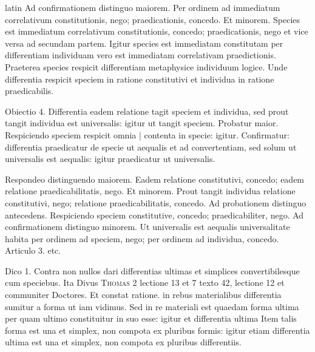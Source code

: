 \begin{otherlanguage*}{latin}
\pstart
 Ad confirmationem distinguo maiorem. Per ordinem ad immediatum correlativum constitutionis, nego; praedicationis, concedo. Et minorem. Species est immediatum correlativum constitutionis, concedo; praedicationis, nego et vice versa ad secundam partem. Igitur species est immediatam constitutam per differentiam individuam vero est immediatam correlativam praedictionis. Praeterea species respicit differentiam metaphysice individuum logice. Unde differentia respicit speciem in ratione constitutivi et individua in ratione praedicabilis. 
\pend

\pstart
 Obiectio 4. Differentia eadem relatione tagit speciem et individua, sed prout tangit individua est universalis: igitur ut tangit speciem. Probatur maior. Respiciendo speciem respicit omnia \textnormal{|} contenta in specie: igitur. Confirmatur: differentia praedicatur de specie ut aequalis et ad convertentiam, sed solum ut universalis est aequalis: igitur praedicatur ut universalis. 
\pend

\pstart
 Respondeo distinguendo maiorem. Eadem relatione constitutivi, concedo; eadem relatione praedicabilitatis, nego. Et minorem. Prout tangit individua relatione constitutivi, nego; relatione praedicabilitatis, concedo. Ad probationem distinguo antecedens. Respiciendo speciem constitutive, concedo; praedicabiliter, nego. Ad confirmationem distinguo minorem. Ut universalis est aequalis universalitate habita per ordinem ad speciem, nego; per ordinem ad individua, concedo. Articulo 3. etc. 
\pend

        \pstart
        \pend
      
\pstart
 Dico 1. Contra non nullos dari differentias ultimas et simplices convertibilesque cum speciebus. Ita  Divus \textsc{Thomas} 2  lectione 13 et 7  texto 42, lectione 12 et communiter Doctores. Et constat ratione. in rebus materialibus differentia sumitur a forma ut iam vidimus. Sed in re materiali est quaedam forma ultima per quam ultimo constituitur in suo esse: igitur et differentia ultima  Item talis forma est una et simplex, non compota ex pluribus formis: igitur etiam differentia ultima est una et simplex, non compota ex pluribus differentiis. 
\pend


\end{otherlanguage*}

